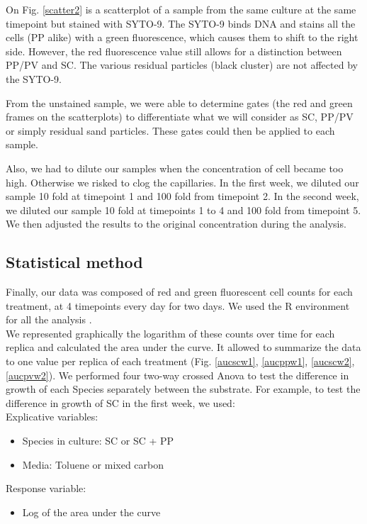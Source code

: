 \documentclass[a4paper, 10pt, conference]{ieeeconf}   %
\begin{document}
On Fig. \ref{scatter2} is a scatterplot of a sample from the same culture at the same timepoint but stained with SYTO-9. The SYTO-9 binds DNA and stains all the cells (PP alike) with a green fluorescence, which causes them to shift to the right side. However, the red fluorescence value still allows for a distinction between PP/PV and SC. The various residual particles (black cluster) are not affected by the SYTO-9. 

From the unstained sample, we were able to determine gates (the red and green frames on the scatterplots) to differentiate what we will consider as SC, PP/PV or simply residual sand particles. These gates could then be applied to each sample.

Also, we had to dilute our samples when the concentration of cell became too high. Otherwise we risked to clog the capillaries.
In the first week, we diluted our sample 10 fold at timepoint 1 and 100 fold from timepoint 2. In the second week, we diluted our sample 10 fold at timepoints 1 to 4 and 100 fold from timepoint 5.
We then adjusted the results to the original concentration during the analysis. 


\subsection{Statistical method}
Finally, our data was composed of red and green fluorescent cell counts for each treatment, at 4 timepoints every day for two days. We used the R environment for all the analysis \cite{R}.\\
We represented graphically the logarithm of these counts over time for each replica and calculated the area under the curve. It allowed to summarize the data to one value per replica of each treatment (Fig. \ref{aucscw1}, \ref{aucppw1}, \ref{aucscw2}, \ref{aucpvw2}).
We performed four two-way crossed Anova to test the difference in growth of each Species separately between the substrate. For example, to test the difference in growth of SC in the first week, we used: \\
Explicative variables:
\begin{itemize}
	\item Species in culture: SC or SC + PP
	\item Media: Toluene or mixed carbon
\end{itemize}
Response variable:
\begin{itemize}
	\item Log of the area under the curve
\end{itemize}
\end{document}

